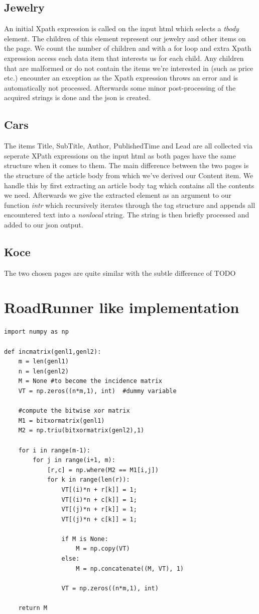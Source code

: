 \documentclass[runningheads]{llncs}
\begin{document}
\subsection{Jewelry}
An initial Xpath expression is called on the input html which selects a \textit{tbody} element. The children of this element represent our jewelry and other items on the page. We count the number of children and with a for loop and extra Xpath expression access each data item that interests us for each child. Any children that are malformed or do not contain the items we're interested in (such as price etc.) encounter an exception as the Xpath expression throws an error and is automatically not processed. Afterwards some minor post-processing of the acquired strings is done and the json is created.

\subsection{Cars}
The items Title, SubTitle, Author, PublishedTime and Lead are all collected via seperate XPath expressions on the input html as both pages have the same structure when it comes to them. The main difference between the two pages is the structure of the article body from which we've derived our Content item. We handle this by first extracting an article body tag which contains all the contents we need. Afterwards we give the extracted element as an argument to our function \textit{intr} which recursively iterates through the tag structure and appends all encountered text into a \textit{nonlocal} string. The string is then briefly processed and added to our json output.

\subsection{Koce}
The two chosen pages are quite similar with the subtle difference of TODO

\section{RoadRunner like implementation}
\begin{lstlisting}
import numpy as np
 
def incmatrix(genl1,genl2):
    m = len(genl1)
    n = len(genl2)
    M = None #to become the incidence matrix
    VT = np.zeros((n*m,1), int)  #dummy variable
 
    #compute the bitwise xor matrix
    M1 = bitxormatrix(genl1)
    M2 = np.triu(bitxormatrix(genl2),1) 
 
    for i in range(m-1):
        for j in range(i+1, m):
            [r,c] = np.where(M2 == M1[i,j])
            for k in range(len(r)):
                VT[(i)*n + r[k]] = 1;
                VT[(i)*n + c[k]] = 1;
                VT[(j)*n + r[k]] = 1;
                VT[(j)*n + c[k]] = 1;
 
                if M is None:
                    M = np.copy(VT)
                else:
                    M = np.concatenate((M, VT), 1)
 
                VT = np.zeros((n*m,1), int)
 
    return M
\end{lstlisting}
\end{document}
